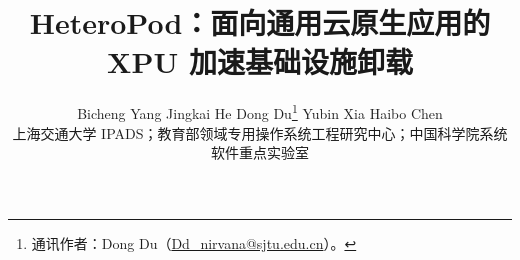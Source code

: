 \documentclass[10pt,twocolumn]{article}
\title{\textbf{HeteroPod：面向通用云原生应用的 XPU 加速基础设施卸载}}
\author{Bicheng Yang \quad Jingkai He \quad Dong Du\thanks{通讯作者：Dong Du（\href{mailto:Dd_nirvana@sjtu.edu.cn}{Dd\_nirvana@sjtu.edu.cn}）。} \quad Yubin Xia \quad Haibo Chen\\[-0.2ex]
\small 上海交通大学 IPADS；教育部领域专用操作系统工程研究中心；中国科学院系统软件重点实验室}
\date{}
\begin{document}
\maketitle






\begingroup
\small
\sloppy


\endgroup
\end{document}

